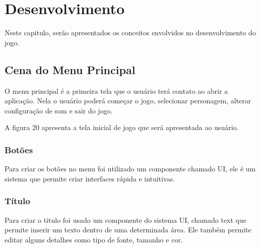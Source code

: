 \chapter{Desenvolvimento}
\label{cap:desenvolvimento}


Neste capitulo, serão apresentados os conceitos envolvidos no desenvolvimento do jogo.

\section{Cena do Menu Principal}
O menu principal é a primeira tela que o usuário terá contato ao abrir a aplicação. Nela o usuário poderá começar o jogo, selecionar personagem, alterar configuração de som e sair do jogo.

A figura 20 apresenta a tela inicial de jogo que será apresentada ao usuário.

\begin{figure}[h!]
		\centering
	\end{figure}
	
\subsection{Botões}
Para criar os botões no menu foi utilizado um componente chamado UI, ele é um sistema que permite criar interfaces rápida e intuitivas. 

\subsection{Título }
Para criar o titulo foi usado um componente do sistema UI, chamado text que permite inserir um texto dentro de uma determinada área. Ele também permite editar alguns detalhes como tipo de fonte, tamanho e cor.


